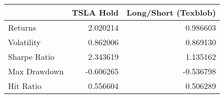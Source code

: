 \begin{tabular}{lrr}
\toprule
{} &  TSLA Hold &  Long/Short (Texblob) \\
\midrule
Returns      &   2.020214 &              0.986603 \\
Volatility   &   0.862006 &              0.869130 \\
Sharpe Ratio &   2.343619 &              1.135162 \\
Max Drawdown &  -0.606265 &             -0.536798 \\
Hit Ratio    &   0.556604 &              0.506289 \\
\bottomrule
\end{tabular}
